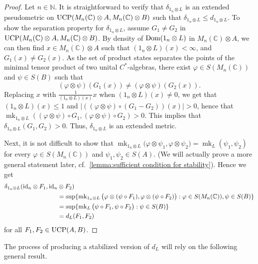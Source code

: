\documentclass[11pt, a4paper, oneside, final, reqno]{amsart}
\newcommand{\bbN}{\mathbb{N}}
\newcommand{\bbC}{\mathbb{C}}
\newcommand{\mk}{\operatorname{mk}}
\theoremstyle{definition}
\theoremstyle{plain}
\theoremstyle{remark}
\numberwithin{equation}{section}
\begin{document}
\begin{proof}
    Let $n\in \bbN$. It is straightforward to verify that $\delta_{1_n\otimes L}$ is an extended pseudometric on ${\rm UCP}(M_n(\bbC)\otimes A, M_n(\bbC)\otimes B)$ such that $\delta_{1_n\otimes L} \leq d_{1_n\otimes L}$. 
    To show the separation property for $\delta_{1_n\otimes L}$, assume $G_1 \neq G_2$ in ${\rm UCP}(M_n(\bbC)\otimes A, M_n(\bbC)\otimes B)$. 
    By density of ${\rm Dom}(1_n\otimes L)$ in $M_n(\bbC)\otimes A$, we can then find $x \in M_n(\bbC)\otimes  A$ such that $(1_n\otimes L)(x) < \infty$, and $G_1(x) \neq G_2(x)$. 
    As the set of product states separates the points of the minimal tensor product of two unital $C^*$-algebras, 
    there exist $\varphi \in S(M_n(\bbC))$ and $\psi \in S(B)$ such that \[(\varphi\otimes\psi)(G_1(x))\neq (\varphi\otimes\psi)(G_2(x)).\]  
    Replacing $x$ with $\frac{1}{(1_n\otimes L)(x)} x$ when $(1_n\otimes L)(x) \neq 0$, we get that  $(1_n\otimes L)(x) \leq 1$ and $|((\varphi\otimes\psi)\circ (G_1-G_2))(x)| > 0$, hence that $\mk_{1_n\otimes L}((\varphi\otimes\psi)\circ G_1, (\varphi\otimes\psi)\circ G_2) > 0$.
    This implies that $\delta_{1_n\otimes L}(G_1, G_2) > 0$. Thus, $\delta_{1_n\otimes L}$ is an extended metric.

    Next, it is not difficult to show that $\mk_{1_n\otimes L}\big(\varphi\otimes \psi_1, \varphi\otimes \psi_2\big) = \mk_L(\psi_1, \psi_2)$ for every $\varphi \in S(M_n(\bbC))$ and $\psi_1, \psi_2 \in S(A)$. (We will actually prove a more general statement later, cf.~\cref{lemma:sufficient condition for stability}). Hence we get
    \begin{align*}
        \delta_{1_n\otimes L}({\rm id}_n \otimes F_1, {\rm id}_n &\otimes F_2) \\
        & = \sup\{\mk_{1_n\otimes L}\big(\varphi\otimes (\psi \circ F_1), \varphi\otimes (\psi\circ F_2)\big) : \varphi \in S(M_n(\bbC)), \psi \in S(B)\}\\
        & = \sup\{\mk_{L}\big(\psi \circ F_1, \psi\circ F_2\big) :  \psi \in S(B)\}\\
        & = d_L(F_1, F_2)
    \end{align*}
    for all $F_1, F_2\in{\rm UCP}(A, B)$.
\end{proof}

The process of producing a stabilized version of $d_L$ will rely on the following general result.
\end{document}
